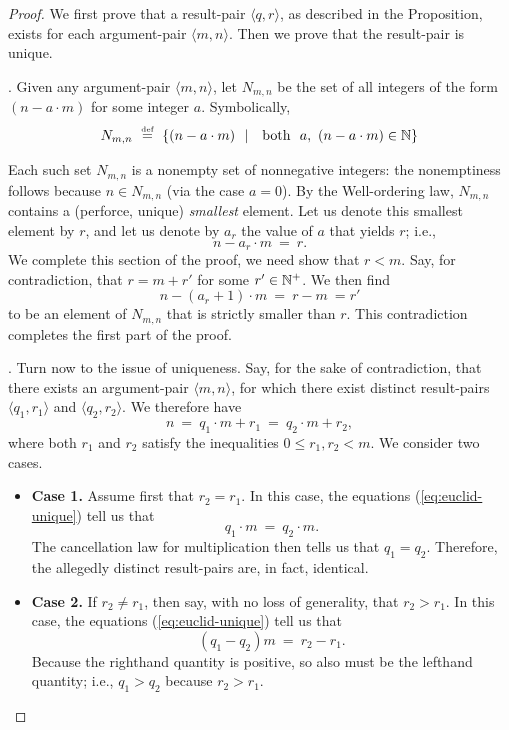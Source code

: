 \begin{proof}
We first prove that a result-pair $\langle q, r \rangle$, as described
in the Proposition, exists for each argument-pair $\langle m, n
\rangle$.  Then we prove that the result-pair is unique.

\medskip

.
%
Given any argument-pair $\langle m, n \rangle$, let $N_{m,n}$ be the
set of all integers of the form $(n - a \cdot m)$ for some
integer $a$.  Symbolically,
\[ N_{m,n} \ \stackrel{\mbox{{\tiny def}}}{=} \ \{ (n - a \cdot m) \ \ | \ \  \mbox{ both } \  a,  \
(n - a \cdot m) \in \mathbb{N}  \}
\]

Each such set $N_{m,n}$ is a nonempty set of nonnegative integers: the
nonemptiness follows because $n \in N_{m,n}$ (via the case $a=0$).  By
the Well-ordering law, $N_{m,n}$ contains a (perforce, unique) {\em
  smallest} element.  Let us denote this smallest element by $r$, and
let us denote by $a_r$ the value of $a$ that yields $r$; i.e.,
\[ n - a_r \cdot m \ = \ r.  \]
We complete this section of the proof, we need show that $r < m$.
Say, for contradiction, that $r = m+r'$ for some $r' \in \mathbb{N}^+$.  We
then find
\[ n - (a_r +1)  \cdot m \ = \ r -m \ = r' \]
to be an element of $N_{m,n}$ that is strictly smaller than $r$.  This
contradiction completes the first part of the proof.
\medskip

.
%
Turn now to the issue of uniqueness.  Say, for the sake of
contradiction, that there exists an argument-pair $\langle m, n
\rangle$, for which there exist distinct result-pairs $\langle q_1,
r_1 \rangle$ and $\langle q_2, r_2 \rangle$.  We therefore have
\begin{equation}
\label{eq:euclid-unique}
n \ = \ q_1 \cdot m + r_1 \ = \ q_2 \cdot m + r_2,
\end{equation}
where both $r_1$ and $r_2$ satisfy the inequalities $0 \leq r_1, r_2
<m$.  We consider two cases.
\begin{itemize}
\item \textbf{Case 1.}
Assume first that $r_2 = r_1$.  In this case, the equations
(\ref{eq:euclid-unique}) tell us that
\[ q_1 \cdot m \ = \ q_2 \cdot m. \]
The cancellation law for multiplication then tells us that $q_1 =
q_2$.  Therefore, the allegedly distinct result-pairs are, in fact,
identical.

\item \textbf{Case 2.}
If $r_2 \neq r_1$, then say, with no loss of generality, that $r_2 >
r_1$.  In this case, the equations (\ref{eq:euclid-unique}) tell us
that
\[ (q_1 - q_2) m \ = \ r_2 - r_1 . \]
Because the righthand quantity is positive, so also must be the
lefthand quantity; i.e., $q_1 > q_2$ because $r_2 > r_1$.


\end{itemize}
\end{proof}
